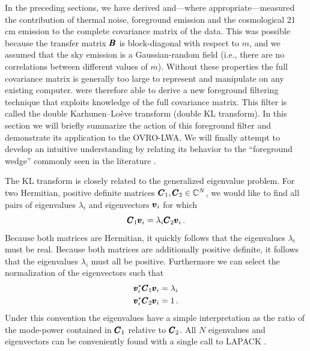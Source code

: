\begin{bibunit}
In the preceding sections, we have derived and---where appropriate---measured the contribution of
thermal noise, foreground emission and the cosmological 21\,cm emission to the complete covariance
matrix of the data. This was possible because the transfer matrix $\pmb B$ is block-diagonal with
respect to $m$, and we assumed that the sky emission is a Gaussian-random field (i.e., there are no
correlations between different values of $m$). Without these properties the full covariance matrix
is generally too large to represent and manipulate on any existing computer.
\citet{2014ApJ...781...57S, 2015PhRvD..91h3514S} were therefore able to derive a new foreground
filtering technique that exploits knowledge of the full covariance matrix. This filter is called the
double Karhunen--Lo\`{e}ve transform (double KL transform). In this section we will briefly
summarize the action of this foreground filter and demonstrate its application to the OVRO-LWA. We
will finally attempt to develop an intuitive understanding by relating its behavior to the
``foreground wedge'' commonly seen in the literature
\citep[e.g.,][]{2012ApJ...745..176V,2012ApJ...756..165P,2015ApJ...804...14T}.

The KL transform is closely related to the generalized eigenvalue problem. For two Hermitian,
positive definite matrices $\pmb C_1, \pmb C_2 \in \mathbb{C}^N$, we would like to find all pairs of
eigenvalues
$\lambda_i$ and eigenvectors $\pmb v_i$ for which
\begin{equation}
    \pmb C_1 \pmb v_i = \lambda_i \pmb C_2 \pmb v_i\,.
\end{equation}
Because both matrices are Hermitian, it quickly follows that the eigenvalues $\lambda_i$ must be
real. Because both matrices are additionally positive definite, it follows that the eigenvalues
$\lambda_i$ must all be positive. Furthermore we can select the normalization of the eigenvectors
such that
\begin{align}
    \pmb v_i^* \pmb C_1 \pmb v_i &= \lambda_i \\
    \pmb v_i^* \pmb C_2 \pmb v_i &= 1\,.
\end{align}
Under this convention the eigenvalues have a simple interpretation as the ratio of the mode-power
contained in $\pmb C_1$ relative to $\pmb C_2$. All $N$ eigenvalues and eigenvectors can be conveniently
found with a single call to LAPACK \citep{Anderson:1990:LPL:110382.110385}.


\end{bibunit}
